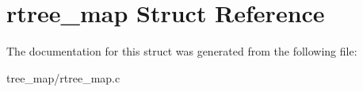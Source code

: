\hypertarget{structrtree__map}{}\section{rtree\+\_\+map Struct Reference}
\label{structrtree__map}


The documentation for this struct was generated from the following file\+:\begin{DoxyCompactItemize}
\item 
tree\+\_\+map/rtree\+\_\+map.\+c\end{DoxyCompactItemize}
